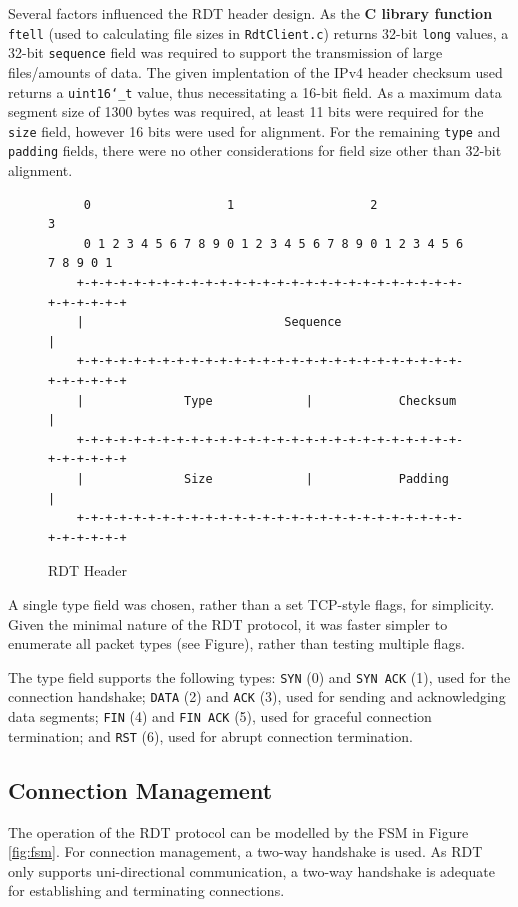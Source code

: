 \documentclass[12pt]{article}
\def\code#1{\texttt{#1}}
\begin{document}
Several factors influenced the RDT header design. As the \textbf{C library function} \code{ftell} (used to calculating file sizes in \code{RdtClient.c}) returns 32-bit \code{long} values, a 32-bit \code{sequence} field was required to support the transmission of large files/amounts of data. The given implentation of the IPv4 header checksum used returns a \code{uint16\char`_t} value, thus necessitating a 16-bit field. As a maximum data segment size of 1300 bytes was required, at least 11 bits were required for the \code{size} field, however 16 bits were used for alignment. For the remaining \code{type} and \code{padding} fields, there were no other considerations for field size other than 32-bit alignment. 

\begin{figure}
    \begin{verbatim}
     0                   1                   2                   3  
     0 1 2 3 4 5 6 7 8 9 0 1 2 3 4 5 6 7 8 9 0 1 2 3 4 5 6 7 8 9 0 1
    +-+-+-+-+-+-+-+-+-+-+-+-+-+-+-+-+-+-+-+-+-+-+-+-+-+-+-+-+-+-+-+-+
    |                            Sequence                           |
    +-+-+-+-+-+-+-+-+-+-+-+-+-+-+-+-+-+-+-+-+-+-+-+-+-+-+-+-+-+-+-+-+
    |              Type             |            Checksum           |
    +-+-+-+-+-+-+-+-+-+-+-+-+-+-+-+-+-+-+-+-+-+-+-+-+-+-+-+-+-+-+-+-+
    |              Size             |            Padding            |
    +-+-+-+-+-+-+-+-+-+-+-+-+-+-+-+-+-+-+-+-+-+-+-+-+-+-+-+-+-+-+-+-+
    \end{verbatim}
    \caption{RDT Header}\label{fig:header}
    \end{figure}

A single type field was chosen, rather than a set TCP-style flags, for simplicity. Given the minimal nature of the RDT protocol, it was faster simpler to enumerate all packet types (see Figure), rather than testing multiple flags.

The type field supports the following types: \code{SYN} (0) and \code{SYN ACK} (1), used for the connection handshake; \code{DATA} (2) and \code{ACK} (3), used for sending and acknowledging data segments; \code{FIN} (4) and \code{FIN ACK} (5), used for graceful connection termination; and \code{RST} (6), used for abrupt connection termination.


\subsection{Connection Management}

The operation of the RDT protocol can be modelled by the FSM in Figure \ref{fig:fsm}. For connection management, a two-way handshake is used. As RDT only supports uni-directional communication, a two-way handshake is adequate for establishing and terminating connections.
\end{document}
